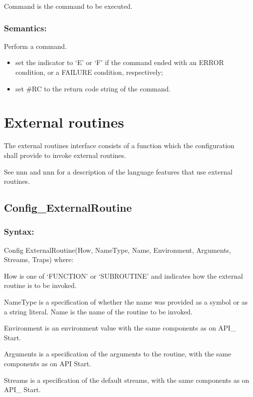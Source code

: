 Command is the command to be executed.

\subsubsection{Semantics:}\label{semantics-17}

Perform a command.

\begin{itemize}
\item
  set the indicator to `E' or `F' if the command ended with an ERROR
  condition, or a FAILURE condition, respectively;
\item
  set \#RC to the return code string of the command.
\end{itemize}

\section{External routines}\label{external-routines}

The external routines interface consists of a function which the
configuration shall provide to invoke external routines.

See nnn and nnn for a description of the language features that use
external routines.

\subsection{Config\_ExternalRoutine}\label{config_externalroutine}

\subsubsection{Syntax:}\label{syntax-17}

Config ExternalRoutine(How, NameType, Name, Environment, Arguments,
Streams, Traps) where:

How is one of `FUNCTION' or `SUBROUTINE' and indicates how the external
routine is to be invoked.

NameType is a specification of whether the name was provided as a symbol
or as a string literal. Name is the name of the routine to be invoked.

Environment is an environment value with the same components as on API\_
Start.

Arguments is a specification of the arguments to the routine, with the
same components as on API Start.

Streams is a specification of the default streams, with the same
components as on API\_ Start.

